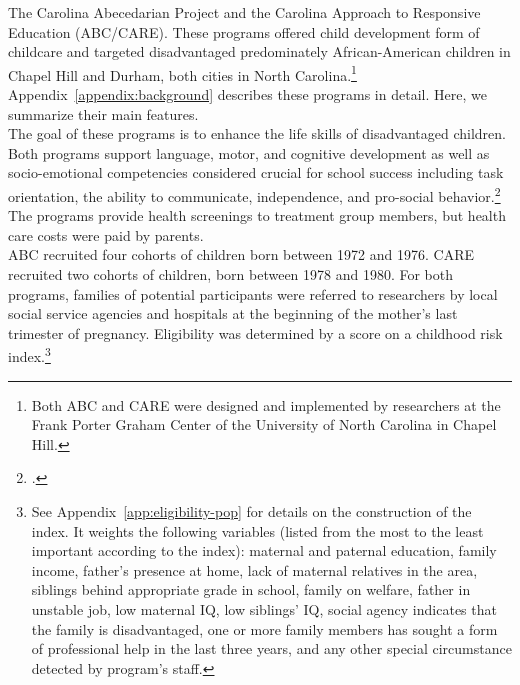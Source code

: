 The Carolina Abecedarian Project and the Carolina Approach to Responsive Education (ABC/CARE). These programs offered child development form of childcare and targeted disadvantaged predominately African-American children in Chapel Hill and Durham, both cities in North Carolina.\footnote{Both ABC and CARE were designed and implemented by researchers at the Frank Porter Graham Center of the University of North Carolina in Chapel Hill.} Appendix~\ref{appendix:background} describes these programs in detail. Here, we summarize their main features.\\

\noindent The goal of these programs is to enhance the life skills of disadvantaged children. Both programs support language, motor, and cognitive development as well as socio-emotional competencies considered crucial for school success including task orientation, the ability to communicate, independence, and pro-social behavior.\footnote{\citet{Sparling_1974_Synth_Edu_Infant_SPEECH, Ramey_Collier_etal_1976_CarolinaAbecedarianProject, Ramey_etal_1985_Project-CARE_TiECSE, Wasik_Ramey_etal_1990_CD, Ramey-etal_2012-ABC}.} The programs provide health screenings to treatment group members, but health care costs were paid by parents.\\

\noindent ABC recruited four cohorts of children born between 1972 and 1976. CARE recruited two cohorts of children, born between 1978 and 1980. For both programs, families of potential participants were referred to researchers by local social service agencies and hospitals at the beginning of the mother's last trimester of pregnancy. Eligibility was determined by a score on a childhood risk index.\footnote{See  Appendix~\ref{app:eligibility-pop} for details on the construction of the index. It weights the following variables (listed from the most to the least important according to the index): maternal and paternal education, family income, father's presence at home, lack of maternal relatives in the area, siblings behind appropriate grade in school, family on welfare, father in unstable job, low maternal IQ, low siblings' IQ, social agency indicates that the family is disadvantaged, one or more family members has sought a form of professional help in the last three years, and any other special circumstance detected by program's staff.}\\

